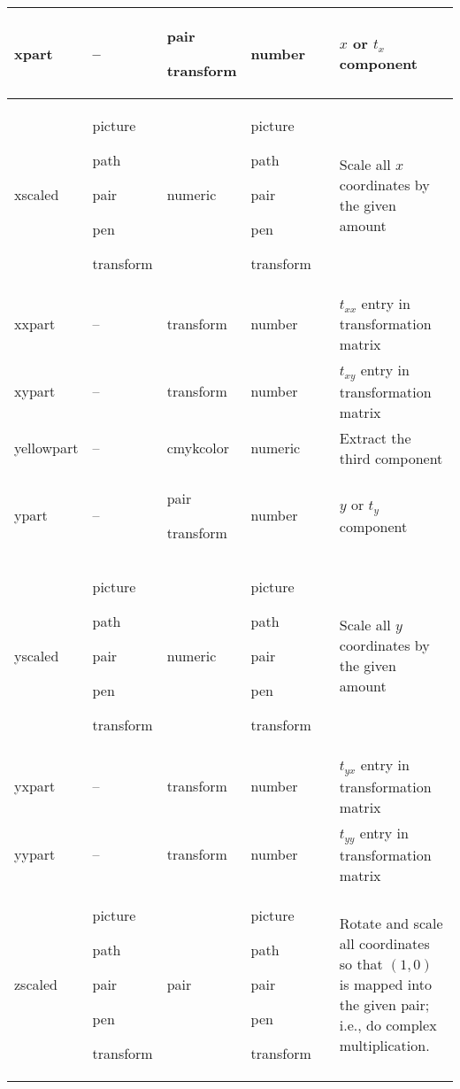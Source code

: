 \begin{longtable}{|>{\raggedright{}\ttfamily}p{.793in}*{3}{|>{\raggedright}p{.715in}}|>{\raggedleft}p{1.5em}|>{\raggedright\arraybackslash}X|}
xpart&  --&  pair\par transform&  number&  \pageref{Dxprt}&  $x$ or $t_x$ component\\\hline
xscaled&  picture\par path\par pair\par pen\par transform&  numeric&  picture\par path\par pair\par pen\par transform&  \pageref{Dtranop}&  Scale all $x$ coordinates by the given amount\\\hline
xxpart&  --&  transform&  number&  \pageref{Dtrprt}&  $t_{xx}$ entry in transformation matrix\\\hline
xypart&  --&  transform&  number&  \pageref{Dtrprt}&  $t_{xy}$ entry in transformation matrix\\\hline
yellowpart&  --&  cmykcolor&  numeric&  \pageref{Dcmykprt}&  Extract the third component\\\hline
ypart&  --&  pair\par transform&  number&  \pageref{Dyprt}&  $y$ or $t_y$ component\\\hline
yscaled&  picture\par path\par pair\par pen\par transform&  numeric&  picture\par path\par pair\par pen\par transform&  \pageref{Dtranop}&  Scale all $y$ coordinates by the given amount\\\hline
yxpart&  --&  transform&  number&  \pageref{Dtrprt}&  $t_{yx}$ entry in transformation matrix\\\hline
yypart&  --&  transform&  number&  \pageref{Dtrprt}&  $t_{yy}$ entry in transformation matrix\\\hline
zscaled&  picture\par path\par pair\par pen\par transform&  pair&  picture\par path\par pair\par pen\par transform&  \pageref{Dtranop}&  Rotate and scale all coordinates so that $(1,0)$ is mapped into the given pair; i.e., do complex multiplication.\\\hline
\end{longtable}

